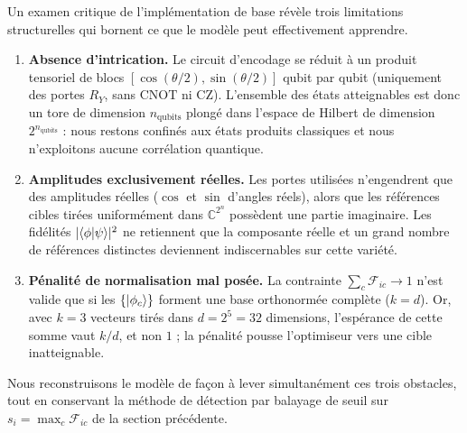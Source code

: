 \documentclass[a4paper]{article}
\begin{document}
Un examen critique de l'implémentation de base révèle trois limitations structurelles qui bornent ce que le modèle peut effectivement apprendre.

\begin{enumerate}
    \item \textbf{Absence d'intrication.} Le circuit d'encodage se réduit à un produit tensoriel de blocs $[\cos(\theta/2), \sin(\theta/2)]$ qubit par qubit (uniquement des portes $R_Y$, sans $\mathrm{CNOT}$ ni $\mathrm{CZ}$). L'ensemble des états atteignables est donc un tore de dimension $n_{\text{qubits}}$ plongé dans l'espace de Hilbert de dimension $2^{n_{\text{qubits}}}$ : nous restons confinés aux états produits classiques et nous n'exploitons aucune corrélation quantique.
    \item \textbf{Amplitudes exclusivement réelles.} Les portes utilisées n'engendrent que des amplitudes réelles ($\cos$ et $\sin$ d'angles réels), alors que les références cibles tirées uniformément dans $\mathbb{C}^{2^n}$ possèdent une partie imaginaire. Les fidélités $|\!\braket{\phi|\psi}\!|^2$ ne retiennent que la composante réelle et un grand nombre de références distinctes deviennent indiscernables sur cette variété.
    \item \textbf{Pénalité de normalisation mal posée.} La contrainte $\sum_c \mathcal{F}_{ic} \to 1$ n'est valide que si les $\{\ket{\phi_c}\}$ forment une base orthonormée complète ($k = d$). Or, avec $k = 3$ vecteurs tirés dans $d = 2^5 = 32$ dimensions, l'espérance de cette somme vaut $k/d$, et non $1$ ; la pénalité pousse l'optimiseur vers une cible inatteignable.
\end{enumerate}

Nous reconstruisons le modèle de façon à lever simultanément ces trois obstacles, tout en conservant la méthode de détection par balayage de seuil sur $s_i = \max_c \mathcal{F}_{ic}$ de la section précédente.
\end{document}
